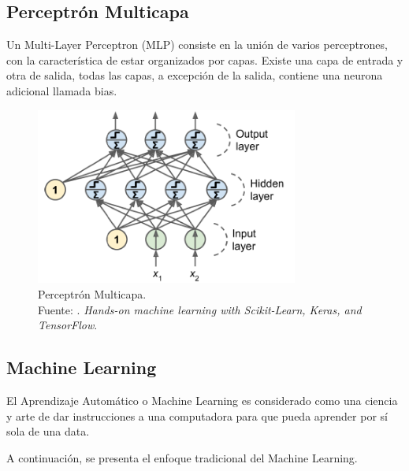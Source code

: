 \subsection{Perceptrón Multicapa}
Un Multi-Layer Perceptron (MLP) consiste en la unión de varios perceptrones, con la característica de estar organizados por capas. Existe una capa de entrada y otra de salida, todas las capas, a excepción de la salida, contiene una neurona adicional llamada bias. \parencite{bk_geron2022handml}

\begin{figure}[H]
	\begin{center}
		\includegraphics[width=0.77\textwidth]{2/figures/mlp.png}
		\caption[Perceptrón Multicapa]{Perceptrón Multicapa. \\
		Fuente: \cite{bk_geron2022handml}. \textit{Hands-on machine learning with Scikit-Learn, Keras, and TensorFlow}.}
		\label{2:fig208}
	\end{center}
\end{figure}


\subsection{Machine Learning}
El Aprendizaje Automático o Machine Learning es considerado como una ciencia y arte de dar instrucciones a una computadora para que pueda aprender por sí sola de una data. \parencite{bk_geron2022handml}

A continuación, se presenta el enfoque tradicional del Machine Learning.

